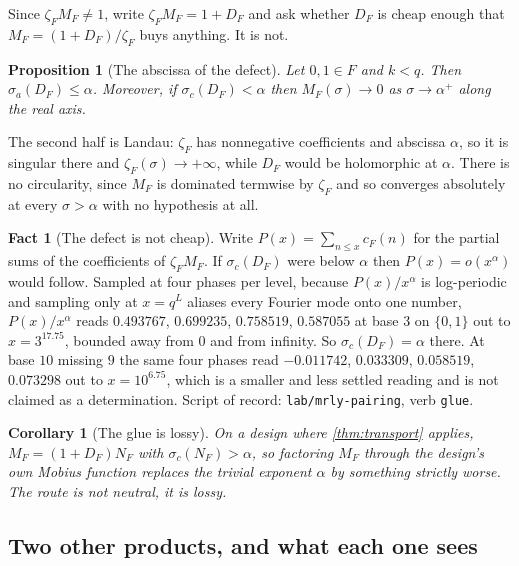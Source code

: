 \documentclass[11pt]{amsart}
\newtheorem{proposition}[theorem]{Proposition}
\newtheorem{corollary}[theorem]{Corollary}
\theoremstyle{definition}
\newtheorem{fact}[theorem]{Fact}
\theoremstyle{remark}
\begin{document}
Since $\zeta_{F} M_{F} \ne 1$, write $\zeta_{F} M_{F} = 1 + D_{F}$ and ask whether $D_{F}$ is cheap enough that $M_{F} = (1 + D_{F})/\zeta_{F}$ buys anything. It is not.

\begin{proposition}[The abscissa of the defect]
\label{prop:glue}
Let $0, 1 \in F$ and $k < q$. Then $\sigma_{a}(D_{F}) \le \alpha$. Moreover, if $\sigma_{c}(D_{F}) < \alpha$ then $M_{F}(\sigma) \to 0$ as $\sigma \to \alpha^{+}$ along the real axis.
\end{proposition}

The second half is Landau: $\zeta_{F}$ has nonnegative coefficients and abscissa $\alpha$, so it is singular there and $\zeta_{F}(\sigma) \to +\infty$, while $D_{F}$ would be holomorphic at $\alpha$. There is no circularity, since $M_{F}$ is dominated termwise by $\zeta_{F}$ and so converges absolutely at every $\sigma > \alpha$ with no hypothesis at all.

\begin{fact}[The defect is not cheap]
\label{fact:glue}
Write $P(x) = \sum_{n \le x} c_{F}(n)$ for the partial sums of the coefficients of $\zeta_{F} M_{F}$. If $\sigma_{c}(D_{F})$ were below $\alpha$ then $P(x) = o(x^{\alpha})$ would follow. Sampled at four phases per level, because $P(x)/x^{\alpha}$ is log-periodic and sampling only at $x = q^{L}$ aliases every Fourier mode onto one number, $P(x)/x^{\alpha}$ reads $0.493767$, $0.699235$, $0.758519$, $0.587055$ at base $3$ on $\{0,1\}$ out to $x = 3^{17.75}$, bounded away from $0$ and from infinity. So $\sigma_{c}(D_{F}) = \alpha$ there. At base $10$ missing $9$ the same four phases read $-0.011742$, $0.033309$, $0.058519$, $0.073298$ out to $x = 10^{6.75}$, which is a smaller and less settled reading and is not claimed as a determination. Script of record: \texttt{lab/mrly-pairing}, verb \texttt{glue}.
\end{fact}

\begin{corollary}[The glue is lossy]
\label{cor:lossy}
On a design where \cref{thm:transport} applies, $M_{F} = (1 + D_{F}) N_{F}$ with $\sigma_{c}(N_{F}) > \alpha$, so factoring $M_{F}$ through the design's own Mobius function replaces the trivial exponent $\alpha$ by something strictly worse. The route is not neutral, it is lossy.
\end{corollary}

\subsection{Two other products, and what each one sees}
\label{sub:products}
\end{document}
